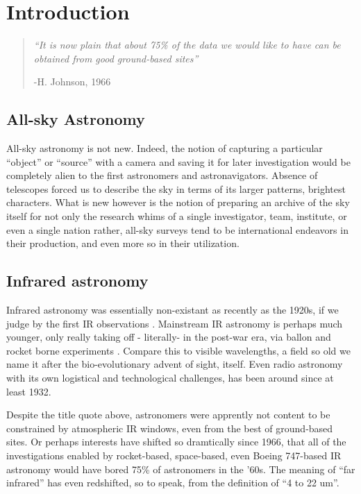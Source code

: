 \chapter{Introduction}
  \label{ch:intro}
  \begin{quotation}
    \small
    \textit{``It is now plain that about 75\% of the data we would like to have can be obtained from good ground-based sites''}

    -H. Johnson, 1966
  \end{quotation}

\section{All-sky Astronomy}


    All-sky astronomy is not new. Indeed, the notion of capturing a particular ``object'' or ``source'' with a camera and saving it for later investigation would be completely alien to the first astronomers and astronavigators. Absence of telescopes forced us to describe the sky in terms of its larger patterns, brightest characters. What is new however is the notion of preparing an archive of the sky itself for not only the research whims of a single investigator, team, institute, or even a single nation\- rather, all-sky surveys tend to be international endeavors in their production, and even more so in their utilization.


  \section{Infrared astronomy}

  Infrared astronomy was essentially non-existant as recently as the 1920s, if we judge by the first IR observations \citep{pettit22, pettit28}. Mainstream IR astronomy is perhaps much younger, only really taking off - literally- in the post-war era, via ballon and rocket borne experiments \citep{johnson66}. Compare this to visible wavelengths, a field so old we name it after the bio-evolutionary advent of sight, itself. Even radio astronomy with its own logistical and technological challenges, has been around since at least 1932.


  Despite the title quote above, astronomers were apprently not content to be constrained by atmospheric IR windows, even from the best of ground-based sites. Or perhaps interests have shifted so dramtically since 1966, that all of the investigations enabled by rocket-based, space-based, even Boeing 747-based IR astronomy would have bored 75\% of astronomers in the '60s. The meaning of ``far infrared'' has even redshifted, so to speak, from the \cite{johnson66} definition of ``4 to 22 um''.

